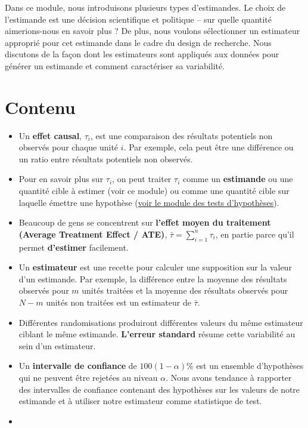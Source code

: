 \documentclass[
  12pt,
]{book}
\begin{document}
Dans ce module, nous introduisons plusieurs types d'estimandes. Le choix de l'estimande est une décision scientifique et politique -- sur quelle quantité aimerions-nous en savoir plus ? De plus, nous voulons sélectionner un estimateur approprié pour cet estimande dans le cadre du design de recherche. Nous discutons de la façon dont les estimateurs sont appliqués aux données pour générer un estimande et comment caractériser sa variabilité.

\hypertarget{contenu-4}{%
\section{Contenu}\label{contenu-4}}

\begin{itemize}
\item
  Un \textbf{effet causal}, \(\tau_i\), est une comparaison des résultats potentiels non observés pour chaque unité \(i\). Par exemple, cela peut être une différence ou un ratio entre résultats potentiels non observés.
\item
  Pour en savoir plus sur \(\tau_{i}\), on peut traiter \(\tau_{i}\) comme un \textbf{estimande} ou une quantité cible à estimer (voir ce module)
  ou comme une quantité cible sur laquelle émettre une hypothèse (\href{hypothesis-testing.html}{voir le module des tests d'hypothèses}).
\item
  Beaucoup de gens se concentrent sur \textbf{l'effet moyen du traitement (Average Treatment Effect / ATE)}, \(\bar{\tau}=\sum_{i=1}^n  \tau_{i}\), en partie parce qu'il permet \textbf{d'estimer} facilement.
\item
  Un \textbf{estimateur} est une recette pour calculer une supposition sur la valeur d'un estimande. Par exemple, la différence entre la moyenne des résultats observés pour \(m\) unités traitées et la moyenne des résultats observés pour \(N-m\) unités non traitées est un estimateur de \(\bar{\tau}\).
\item
  Différentes randomisations produiront différentes valeurs du même estimateur ciblant le même estimande. \textbf{L'erreur standard} résume cette variabilité au sein d'un estimateur.
\item
  Un \textbf{intervalle de confiance} de \(100(1-\alpha)\)\% est un ensemble d'hypothèses qui ne peuvent être rejetées au niveau \(\alpha\). Nous avons tendance à rapporter des intervalles de confiance contenant des hypothèses sur les valeurs de notre estimande et à utiliser notre estimateur comme statistique de test.
\item

\end{itemize}
\end{document}
